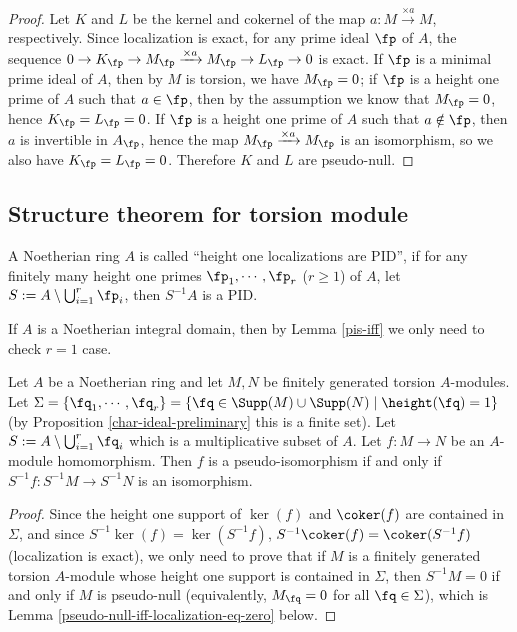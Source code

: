\begin{proof}
\leanok
Let $K$ and $L$ be the kernel and cokernel of the map
$a:M\xrightarrow{\times a}M$, respectively.
Since localization is exact, for any prime ideal $\fp$ of $A$,
the sequence $0\to K_\fp\to M_\fp\xrightarrow{\times a}M_\fp\to L_\fp\to 0$
is exact.
If $\fp$ is a minimal prime ideal of $A$, then by $M$ is torsion,
we have $M_\fp=0$; if $\fp$ is a height one prime of $A$
such that $a\in\fp$, then by the assumption we know that $M_\fp=0$,
hence $K_\fp=L_\fp=0$.
If $\fp$ is a height one prime of $A$
such that $a\notin\fp$, then $a$ is invertible in $A_\fp$,
hence the map $M_\fp\xrightarrow{\times a}M_\fp$ is an isomorphism,
so we also have $K_\fp=L_\fp=0$.
Therefore $K$ and $L$ are pseudo-null.
\end{proof}

\subsection{Structure theorem for torsion module}

\begin{definition}
\label{ht-1-localization-is-PID}
\leanok
A Noetherian ring $A$ is called
``height one localizations are PID'', if
for any finitely many height one primes $\fp_1,\cdots,\fp_r$ ($r\geq 1$) of $A$,
let $S:=A\setminus\bigcup_{i=1}^r\fp_i$, then $S^{-1}A$ is a PID.
\end{definition}

If $A$ is a Noetherian integral domain, then by Lemma \ref{pis-iff} we
only need to check $r=1$ case.

\begin{lem}
\label{pis-iff}
\leanok
Let $A$ be a Noetherian ring and let
$M,N$ be finitely generated torsion $A$-modules.
Let $\Sigma=\{\fq_1,\cdots,\fq_r\}
=\{\fq\in\Supp(M)\cup\Supp(N)\mid\height(\fq)=1\}$
(by Proposition \ref{char-ideal-preliminary} this is a finite set).
Let $S:=A\setminus\bigcup_{i=1}^r\fq_i$ which is a multiplicative subset of $A$.
Let $f:M\to N$ be an $A$-module homomorphism.
Then $f$ is a pseudo-isomorphism if and only if $S^{-1}f:S^{-1}M\to S^{-1}N$
is an isomorphism.
\end{lem}

\begin{proof}
\leanok
Since the height one support of $\ker(f)$ and $\coker(f)$
are contained in $\Sigma$,
and since $S^{-1}\ker(f)=\ker(S^{-1}f)$,
$S^{-1}\coker(f)=\coker(S^{-1}f)$ (localization is exact),
we only need to prove that if $M$ is a finitely generated torsion $A$-module
whose height one support is contained in $\Sigma$,
then $S^{-1}M=0$ if and only if $M$ is pseudo-null (equivalently, $M_\fq=0$
for all $\fq\in\Sigma$), which is Lemma \ref{pseudo-null-iff-localization-eq-zero} below.
\end{proof}

